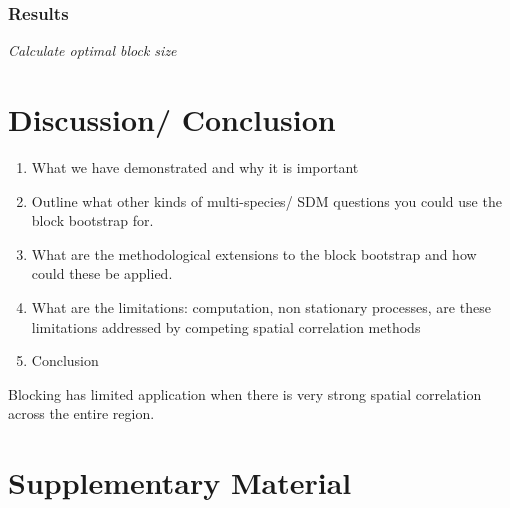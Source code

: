 \documentclass[a4paper,12pt]{article}
\begin{document}
\subsubsection{Results}
%
%
%

\emph{Calculate optimal block size}


\section{ Discussion/ Conclusion}
\begin{enumerate}
\item What we have demonstrated and why it is important
\item Outline what other kinds of multi-species/ SDM questions you could use the block bootstrap for. 
\item What are the methodological extensions to the block bootstrap and how could these be applied. 
\item What are the limitations: computation, non stationary processes, are these limitations addressed by competing spatial correlation methods
\item Conclusion
\end{enumerate}

Blocking has limited application when there is very strong spatial correlation across the entire region. 

\citep{Pitt199878}
\citep{taper2004bootstrapping}


\section{Supplementary Material}
\end{document}

